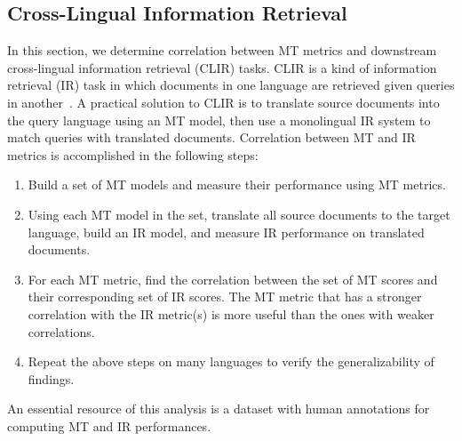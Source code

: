 \subsection{Cross-Lingual Information Retrieval}
\label{sec:clir}
In this section, we determine correlation between MT metrics and  downstream cross-lingual information retrieval (CLIR) tasks.
CLIR is a kind of information retrieval (IR) task in which documents in one language are retrieved given queries in another~\cite{grefenstette2012CLIR}. 
A practical solution to CLIR is to translate source documents into the query language using an MT model, then use a monolingual IR system to match queries with translated documents. 
Correlation between MT and IR metrics is accomplished in the following steps: 
\begin{enumerate}[noitemsep,topsep=0pt]
 \item Build a set of MT models and measure their performance using MT metrics.
 \item Using each MT model in the set, translate all source documents to the target language, build an IR model, and measure IR performance on translated documents.
 \item For each MT metric, find the correlation between the set of MT scores and their corresponding set of IR scores.
 The MT metric that has a stronger correlation with the IR metric(s) is more useful than the ones with weaker correlations.
\item Repeat the above steps on many languages to verify the generalizability of findings.
\end{enumerate}


An essential resource of this analysis is a dataset with human annotations for computing MT and IR performances.

